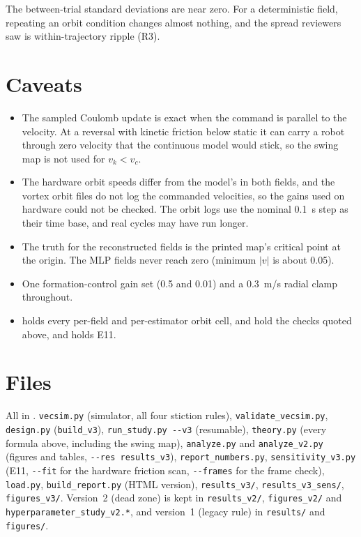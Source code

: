 \documentclass[10pt,letterpaper]{article}
\begin{document}
The between-trial standard deviations are near zero. For a deterministic field, repeating an orbit condition changes almost nothing, and the spread reviewers saw is within-trajectory ripple (R3).

\section*{Caveats}

\begin{itemize}
\item The sampled Coulomb update is exact when the command is parallel to the velocity. At a reversal with kinetic friction below static it can carry a robot through zero velocity that the continuous model would stick, so the swing map is not used for $v_k < v_c$.
\item The hardware orbit speeds differ from the model's in both fields, and the vortex orbit files do not log the commanded velocities, so the gains used on hardware could not be checked. The orbit logs use the nominal 0.1~s step as their time base, and real cycles may have run longer.
\item The truth for the reconstructed fields is the printed map's critical point at the origin. The MLP fields never reach zero (minimum $|v|$ is about 0.05).
\item One formation-control gain set (0.5 and 0.01) and a 0.3~m/s radial clamp throughout.
\item {} holds every per-field and per-estimator orbit cell,  and  hold the checks quoted above, and  holds E11.
\end{itemize}

\section*{Files}

{\raggedright All in . \texttt{vecsim.py} (simulator, all four stiction rules), \texttt{validate\_vecsim.py}, \texttt{design.py} (\texttt{build\_v3}), \texttt{run\_study.py -{}-v3} (resumable), \texttt{theory.py} (every formula above, including the swing map), \texttt{analyze.py} and \texttt{analyze\_v2.py} (figures and tables, \texttt{-{}-res results\_v3}), \texttt{report\_numbers.py}, \texttt{sensitivity\_v3.py} (E11, \texttt{-{}-fit} for the hardware friction scan, \texttt{-{}-frames} for the frame check), \texttt{load.py}, \texttt{build\_report.py} (HTML version), \texttt{results\_v3/}, \texttt{results\_v3\_sens/}, \texttt{figures\_v3/}. Version~2 (dead zone) is kept in \texttt{results\_v2/}, \texttt{figures\_v2/} and \texttt{hyperparameter\_study\_v2.*}, and version~1 (legacy rule) in \texttt{results/} and \texttt{figures/}.\par}
\end{document}
